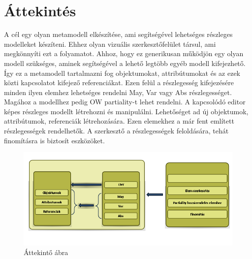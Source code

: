 \chapter{Áttekintés}


A cél egy olyan metamodell elkészítése, ami segítségével lehetséges részleges modelleket készíteni. Ehhez olyan vizuális szerkesztőfelület társul, ami megkönnyíti ezt a folyamatot. Ahhoz, hogy ez generikusan működjön egy olyan modell szükséges, aminek segítségével a lehető legtöbb egyéb modell kifejezhető. Így ez a metamodell tartalmazni fog objektumokat, attribútumokat és az ezek közti kapcsolatot kifejező referenciákat. Ezen felül a részlegesség kifejezésére minden ilyen elemhez lehetséges rendelni May, Var vagy Abs részlegességet. Magához a modellhez pedig OW partiality-t lehet rendelni.
A kapcsolódó editor képes részleges modellt létrehozni és manipulálni. Lehetőséget ad új objektumok, attribútumok, referenciák létrehozására. Ezen elemekhez a már fent említett részlegességek rendelhetők. A szerkesztő a részlegességek feloldására, tehát finomításra is biztosít eszközöket.

\begin{figure}[!ht]
	\centering
	\includegraphics[width=150mm]{figures/overview.png}
	\caption{Áttekintő ábra} 
\end{figure}

